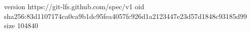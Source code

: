version https://git-lfs.github.com/spec/v1
oid sha256:83d1107174ca0ca9b1dc95fea4057fc926d1a2123447e23d57d1848c93185d99
size 104840
